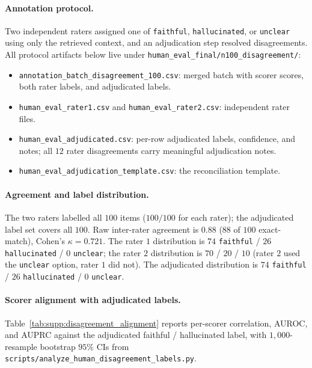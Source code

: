 \paragraph{Annotation protocol.} Two independent raters assigned one
of \texttt{faithful}, \texttt{hallucinated}, or \texttt{unclear} using
only the retrieved context, and an adjudication step resolved
disagreements. All protocol artifacts below live under
\texttt{human\_eval\_final/n100\_disagreement/}:
\begin{itemize}
    \item \texttt{annotation\_batch\_disagreement\_100.csv}: merged
    batch with scorer scores, both rater labels, and adjudicated labels.
    \item \texttt{human\_eval\_rater1.csv} and
    \texttt{human\_eval\_rater2.csv}: independent rater files.
    \item \texttt{human\_eval\_adjudicated.csv}: per-row adjudicated
    labels, confidence, and notes; all $12$ rater disagreements carry
    meaningful adjudication notes.
    \item \texttt{human\_eval\_adjudication\_template.csv}: the
    reconciliation template.
\end{itemize}

\paragraph{Agreement and label distribution.}
The two raters labelled all $100$ items
($100/100$ for each rater); the adjudicated label set covers all
$100$. Raw inter-rater agreement is $0.88$ ($88$ of $100$
exact-match), Cohen's $\kappa=0.721$. The rater $1$ distribution is
$74$ \texttt{faithful} / $26$ \texttt{hallucinated} / $0$
\texttt{unclear}; the rater $2$ distribution is $70$ /
$20$ / $10$ (rater $2$ used the \texttt{unclear} option, rater $1$
did not). The adjudicated distribution is
$74$ \texttt{faithful} / $26$ \texttt{hallucinated} / $0$
\texttt{unclear}.

\paragraph{Scorer alignment with adjudicated labels.}
Table~\ref{tab:supp:disagreement_alignment} reports per-scorer
correlation, AUROC, and AUPRC against the adjudicated faithful /
hallucinated label, with $1{,}000$-resample bootstrap $95\%$ CIs from
\texttt{scripts/analyze\_human\_disagreement\_labels.py}.

